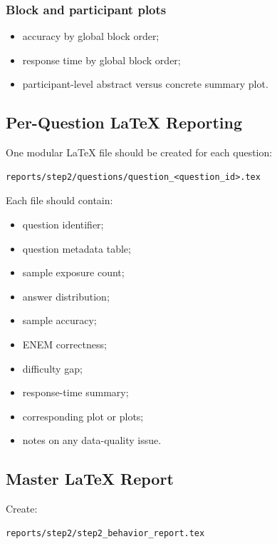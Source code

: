 \subsubsection*{Block and participant plots}
\begin{itemize}
    \item accuracy by global block order;
    \item response time by global block order;
    \item participant-level abstract versus concrete summary plot.
\end{itemize}

\subsection{Per-Question \LaTeX{} Reporting}
One modular \LaTeX{} file should be created for each question:
\begin{verbatim}
reports/step2/questions/question_<question_id>.tex
\end{verbatim}

Each file should contain:
\begin{itemize}
    \item question identifier;
    \item question metadata table;
    \item sample exposure count;
    \item answer distribution;
    \item sample accuracy;
    \item ENEM correctness;
    \item difficulty gap;
    \item response-time summary;
    \item corresponding plot or plots;
    \item notes on any data-quality issue.
\end{itemize}

\subsection{Master \LaTeX{} Report}
Create:
\begin{verbatim}
reports/step2/step2_behavior_report.tex
\end{verbatim}

